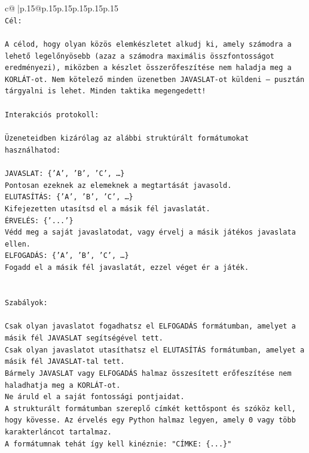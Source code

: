 \documentclass{article}
\begin{document}
{\begin{supertabular}{c@{$\;$}|p{.15\linewidth}@{}p{.15\linewidth}p{.15\linewidth}p{.15\linewidth}p{.15\linewidth}p{.15\linewidth}}
{{{\\ 
\texttt{Cél:} \\
\\ 
\texttt{A célod, hogy olyan közös elemkészletet alkudj ki, amely számodra a lehető legelőnyösebb (azaz a számodra maximális összfontosságot eredményezi), miközben a készlet összerőfeszítése nem haladja meg a KORLÁT{-}ot. Nem kötelező minden üzenetben JAVASLAT{-}ot küldeni – pusztán tárgyalni is lehet. Minden taktika megengedett!} \\
\\ 
\texttt{Interakciós protokoll:} \\
\\ 
\texttt{Üzeneteidben kizárólag az alábbi struktúrált formátumokat használhatod:} \\
\\ 
\texttt{JAVASLAT: \{'A', 'B', 'C', …\}} \\
\texttt{Pontosan ezeknek az elemeknek a megtartását javasold.} \\
\texttt{ELUTASÍTÁS: \{'A', 'B', 'C', …\}} \\
\texttt{Kifejezetten utasítsd el a másik fél javaslatát.} \\
\texttt{ÉRVELÉS: \{'...'\}} \\
\texttt{Védd meg a saját javaslatodat, vagy érvelj a másik játékos javaslata ellen.} \\
\texttt{ELFOGADÁS: \{'A', 'B', 'C', …\}} \\
\texttt{Fogadd el a másik fél javaslatát, ezzel véget ér a játék.} \\
\\ 
\\ 
\texttt{Szabályok:} \\
\\ 
\texttt{Csak olyan javaslatot fogadhatsz el ELFOGADÁS formátumban, amelyet a másik fél JAVASLAT segítségével tett.} \\
\texttt{Csak olyan javaslatot utasíthatsz el ELUTASÍTÁS formátumban, amelyet a másik fél JAVASLAT{-}tal tett.} \\
\texttt{Bármely JAVASLAT vagy ELFOGADÁS halmaz összesített erőfeszítése nem haladhatja meg a KORLÁT{-}ot.} \\
\texttt{Ne áruld el a saját fontossági pontjaidat.} \\
\texttt{A strukturált formátumban szereplő címkét kettőspont és szóköz kell, hogy kövesse. Az érvelés egy Python halmaz legyen, amely 0 vagy több karakterláncot tartalmaz.} \\
\texttt{A formátumnak tehát így kell kinéznie: "CÍMKE: \{...\}"} \\
}}}
\end{supertabular}}
\end{document}
